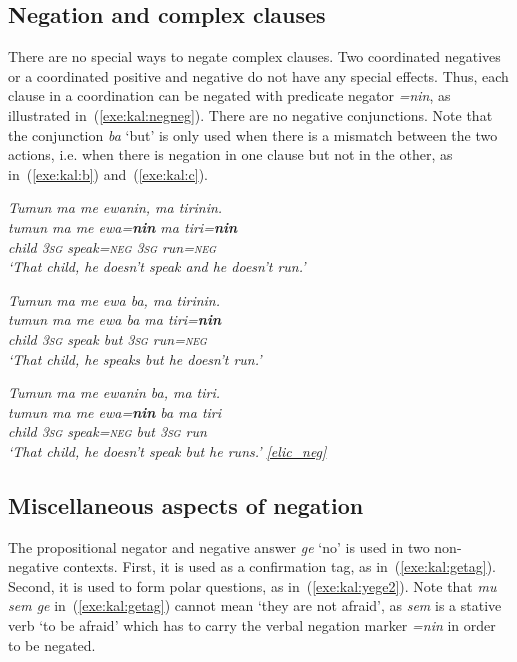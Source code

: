\documentclass[output=paper,colorlinks,citecolor=brown,draft]{langscibook}
\begin{document}
\subsection{Negation and complex clauses}
\label{sec:complexneg}
There are no special ways to negate complex clauses. Two coordinated negatives or a coordinated positive and negative do not have any special effects. Thus, each clause in a coordination can be negated with predicate negator \textit{=nin}, as illustrated in~(\ref{exe:kal:negneg}). There are no negative conjunctions. Note that the conjunction \textit{ba} `but' is only used when there is a mismatch between the two actions, i.e. when there is negation in one clause but not in the other, as in~(\ref{exe:kal:b}) and~(\ref{exe:kal:c}).

\ea 	\label{exe:kal:negneg}
\ea  \label{exe:kal:a}
\itshape Tumun ma me ewanin, ma tirinin.\\
\gll tumun ma me ewa=\textbf{nin} ma tiri=\textbf{nin}\\
child \textsc{3sg} {\glme} speak=\textsc{neg} \textsc{3sg} run=\textsc{neg}\\ 
\glt	`That child, he doesn't speak and he doesn't run.'

\ex \label{exe:kal:b}
\itshape Tumun ma me ewa ba, ma tirinin.\\
\gll tumun ma me ewa ba ma tiri=\textbf{nin}\\
child \textsc{3sg} {\glme} speak but \textsc{3sg} run=\textsc{neg}\\ 
\glt	`That child, he speaks but he doesn't run.'

\ex \label{exe:kal:c}
\itshape Tumun ma me ewanin ba, ma tiri.\\
\gll tumun ma me ewa=\textbf{nin} ba ma tiri\\
child \textsc{3sg} {\glme} speak=\textsc{neg} but \textsc{3sg} run\\ 
\glt	`That child, he doesn't speak but he runs.' {\href{http://hdl.handle.net/10050/00-0000-0000-0004-1C60-A}{[elic\_neg]}}
\z \z 

\subsection{Miscellaneous aspects of negation} 
The propositional negator and negative answer \textit{ge} `no' is used in two non-negative contexts. First, it is used as a confirmation tag, as in~(\ref{exe:kal:getag}). Second, it is used to form polar questions, as in~(\ref{exe:kal:yege2}). Note that \textit{mu sem ge} in~(\ref{exe:kal:getag}) cannot mean `they are not afraid', as \textit{sem} is a stative verb `to be afraid' which has to carry the verbal negation marker \textit{=nin} in order to be negated.
\end{document}
